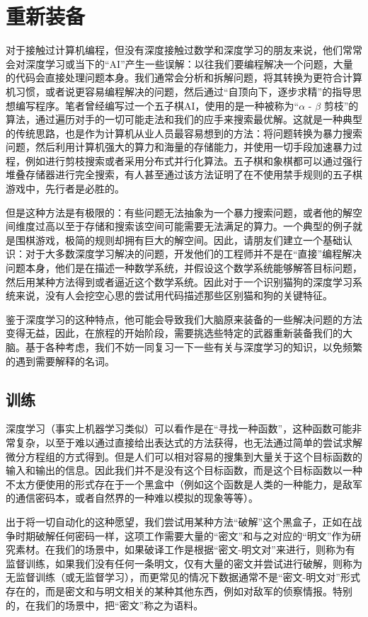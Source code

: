 \documentclass{article}
\begin{document}
\section{重新装备}
对于接触过计算机编程，但没有深度接触过数学和深度学习的朋友来说，他们常常会对深度学习或当下的“AI”产生一些误解：以往我们要编程解决一个问题，大量的代码会直接处理问题本身。我们通常会分析和拆解问题，将其转换为更符合计算机习惯，或者说更容易编程解决的问题，然后通过“自顶向下，逐步求精”的指导思想编写程序。笔者曾经编写过一个五子棋AI，使用的是一种被称为“$\alpha$ - $\beta$ 剪枝”的算法，通过遍历对手的一切可能走法和我们的应手来搜索最优解。这就是一种典型的传统思路，也是作为计算机从业人员最容易想到的方法：将问题转换为暴力搜索问题，然后利用计算机强大的算力和海量的存储能力，并使用一切手段加速暴力过程，例如进行剪枝搜索或者采用分布式并行化算法。五子棋和象棋都可以通过强行堆叠存储器进行完全搜索，有人甚至通过该方法证明了在不使用禁手规则的五子棋游戏中，先行者是必胜的。

但是这种方法是有极限的：有些问题无法抽象为一个暴力搜索问题，或者他的解空间维度过高以至于存储和搜索该空间可能需要无法满足的算力。一个典型的例子就是围棋游戏，极简的规则却拥有巨大的解空间。因此，请朋友们建立一个基础认识：对于大多数深度学习解决的问题，开发他们的工程师并不是在“直接”编程解决问题本身，他们是在描述一种数学系统，并假设这个数学系统能够解答目标问题，然后用某种方法得到或者逼近这个数学系统。因此对于一个识别猫狗的深度学习系统来说，没有人会挖空心思的尝试用代码描述那些区别猫和狗的关键特征。

鉴于深度学习的这种特点，他可能会导致我们大脑原来装备的一些解决问题的方法变得无益，因此，在旅程的开始阶段，需要挑选些特定的武器重新装备我们的大脑。基于各种考虑，我们不妨一同复习一下一些有关与深度学习的知识，以免频繁的遇到需要解释的名词。
\subsection{训练}
深度学习（事实上机器学习类似）可以看作是在“寻找一种函数”，这种函数可能非常复杂，以至于难以通过直接给出表达式的方法获得，也无法通过简单的尝试求解微分方程组的方式得到。但是人们可以相对容易的搜集到大量关于这个目标函数的输入和输出的信息。因此我们并不是没有这个目标函数，而是这个目标函数以一种不太方便使用的形式存在于一个黑盒中（例如这个函数是人类的一种能力，是敌军的通信密码本，或者自然界的一种难以模拟的现象等等）。

出于将一切自动化的这种愿望，我们尝试用某种方法“破解”这个黑盒子，正如在战争时期破解任何密码一样，这项工作需要大量的“密文”和与之对应的“明文”作为研究素材。在我们的场景中，如果破译工作是根据“密文-明文对”来进行，则称为有监督训练，如果我们没有任何一条明文，仅有大量的密文并尝试进行破解，则称为无监督训练（或无监督学习），而更常见的情况下数据通常不是“密文-明文对”形式存在的，而是密文和与明文相关的某种其他东西，例如对敌军的侦察情报。特别的，在我们的场景中，把“密文”称之为语料。
\end{document}
